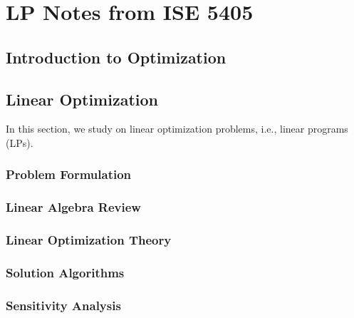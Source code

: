 \documentclass[letter,12pt]{book}
\renewcommand{\0}{\mathbf{0}}
\begin{document}




%
%
%





%


\chapter{LP Notes from ISE 5405}
\section{Introduction to Optimization}


\newpage \section{Linear Optimization}
In this section, we study on linear optimization problems, i.e., linear programs (LPs).

\subsection{Problem Formulation} 


\subsection{Linear Algebra Review} 


\subsection{Linear Optimization Theory} 


\subsection{Solution Algorithms}  


\subsection{Sensitivity Analysis} 

\end{document}
